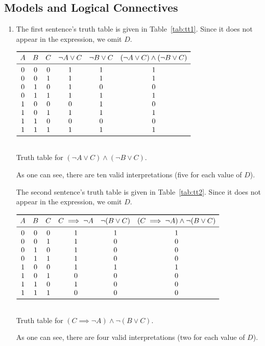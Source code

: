 \documentclass[journal,onecolumn]{IEEEtran}
\begin{document}
\subsection{Models and Logical Connectives}
\begin{enumerate}
	\item The first sentence's truth table is given in Table~\ref{tab:tt1}.
	Since it does not appear in the expression, we omit \(D\).
	\begin{table}[H]
		\centering
		\(
		\begin{array}{ccc@{\quad}ccc}
		\toprule
		A & B & C & \lnot A  \lor C & \lnot B \lor C & (\lnot A  \lor C) \land (\lnot B \lor C)\\
		\midrule
		0 & 0 & 0 & 1 & 1 & 1 \\
		0 & 0 & 1 & 1 & 1 & 1 \\
		0 & 1 & 0 & 1 & 0 & 0 \\
		0 & 1 & 1 & 1 & 1 & 1 \\
		1 & 0 & 0 & 0 & 1 & 0 \\
		1 & 0 & 1 & 1 & 1 & 1 \\
		1 & 1 & 0 & 0 & 0 & 0 \\
		1 & 1 & 1 & 1 & 1 & 1 \\
		\bottomrule\\
		\end{array}
		\)
	\caption{Truth table for \((\lnot A  \lor C) \land (\lnot B \lor C)\).}
	\label{tab:tt1}
	\end{table}
	As one can see, there are ten valid interpretations (five for each value of \(D\)).
	
	The second sentence's truth table is given in Table~\ref{tab:tt2}.
	Since it does not appear in the expression, we omit \(D\).
	\begin{table}[H]
		\centering
		\(
		\begin{array}{ccc@{\quad}ccc}
		\toprule
		A & B & C & C \implies \lnot A & \lnot(B \lor C) & (C \implies \lnot A) \land \lnot(B \lor C)\\
		\midrule
		0 & 0 & 0 & 1 & 1 & 1 \\
		0 & 0 & 1 & 1 & 0 & 0 \\
		0 & 1 & 0 & 1 & 0 & 0 \\
		0 & 1 & 1 & 1 & 0 & 0 \\
		1 & 0 & 0 & 1 & 1 & 1 \\
		1 & 0 & 1 & 0 & 0 & 0 \\
		1 & 1 & 0 & 1 & 0 & 0 \\
		1 & 1 & 1 & 0 & 0 & 0 \\
		\bottomrule\\
		\end{array}
		\)
		\caption{Truth table for \((C \implies \lnot A) \land \lnot(B \lor C)\).}
		\label{tab:tt2}
	\end{table}
	As one can see, there are four valid interpretations (two for each value of \(D\)).
	

\end{enumerate}
\end{document}
